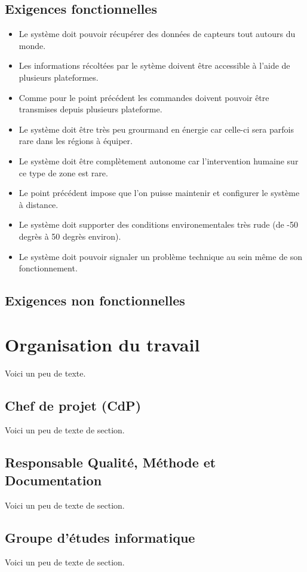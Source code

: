    \section{Exigences fonctionnelles}
\begin{itemize}
\item Le système doit pouvoir récupérer des données de capteurs tout autours du monde.
\item Les informations récoltées par le sytème doivent être accessible à l'aide de plusieurs plateformes.
\item Comme pour le point précédent les commandes doivent pouvoir être transmises depuis plusieurs plateforme.
\item Le système doit être très peu grourmand en énergie car celle-ci sera parfois rare dans les régions à équiper.
\item Le système doit être complètement autonome car l'intervention humaine sur ce type de zone est rare.
\item Le point précédent impose que l'on puisse maintenir et configurer le système à distance.
\item Le système doit supporter des conditions environementales très rude (de -50 degrès à 50 degrès environ).
\item Le système doit pouvoir signaler un problème technique au sein même de son fonctionnement.
\end{itemize}

    \section{Exigences non fonctionnelles}
    \chapter{Organisation du travail}
    Voici un peu de texte.
    \section{Chef de projet (CdP)}
    Voici un peu de texte de section.
    \section{Responsable Qualité, Méthode et Documentation}
    Voici un peu de texte de section.
    \section{Groupe d'études informatique}
    Voici un peu de texte de section.
    
